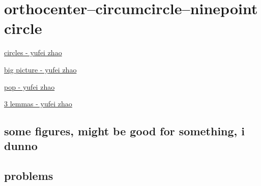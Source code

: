 \graphicspath{{Pics/}}


\newpage\section{orthocenter--circumcircle--ninepoint circle}


\begin{myitemize}
\item \href{http://yufeizhao.com/olympiad/imo2008/zhao-circles.pdf}{circles - yufei zhao}
\item \href{http://yufeizhao.com/olympiad/cyclic_quad.pdf}{big picture - yufei zhao}
\item \href{http://yufeizhao.com/olympiad/power_of_a_point.pdf}{pop - yufei zhao}
\item \href{http://yufeizhao.com/olympiad/three_geometry_lemmas.pdf}{3 lemmas - yufei zhao}
\end{myitemize}


\subsection{some figures, might be good for something, i dunno}




\subsection{problems}


\begin{minipage}{.3\textwidth}
\end{minipage}\hfill%
\begin{minipage}{.65\textwidth}
\end{minipage}








